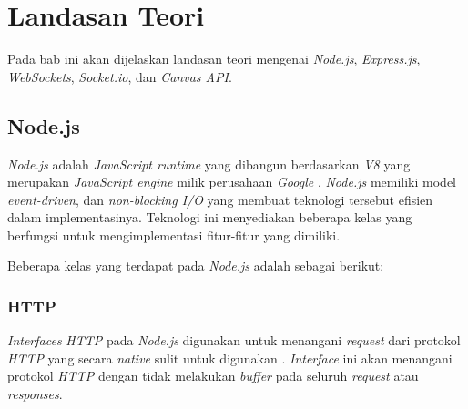 \chapter{Landasan Teori}
\label{chap:teori}

Pada bab ini akan dijelaskan landasan teori mengenai \textit{Node.js}, \textit{Express.js}, \textit{WebSockets}, \textit{Socket.io}, dan \textit{Canvas API}.

\section{Node.js}


\label{sec:Node.js}

\textit{Node.js} adalah \textit{JavaScript runtime} yang dibangun berdasarkan \textit{V8} yang merupakan \textit{JavaScript engine} milik perusahaan \textit{Google} \cite{dahl:09:nodejs}. \textit{Node.js} memiliki model \textit{event-driven}, dan \textit{non-blocking I/O} yang membuat teknologi tersebut efisien dalam implementasinya. Teknologi ini menyediakan beberapa kelas yang berfungsi untuk mengimplementasi fitur-fitur yang dimiliki.

Beberapa kelas yang terdapat pada \textit{Node.js} adalah sebagai berikut: 

\subsection{HTTP}
\textit{Interfaces} \textit{HTTP} pada \textit{Node.js} digunakan untuk menangani \textit{request} dari protokol \textit{HTTP} yang secara \textit{native} sulit untuk digunakan \cite{dahl:09:nodejsdocs}. \textit{Interface} ini akan menangani protokol \textit{HTTP} dengan tidak melakukan \textit{buffer} pada seluruh \textit{request} atau \textit{responses}.


